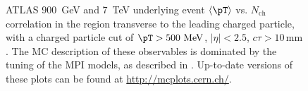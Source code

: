 \begin{figure}[tp]
  \centering
  \caption{ATLAS 900~GeV and 7~TeV underlying event $\langle \pT \rangle$
    vs. $N_\text{ch}$ correlation in the region transverse to the
    leading charged particle, with a charged particle \pT cut of
    $\pT > 500~\text{MeV}$, $|\eta| < 2.5$, $c\tau > 10\,\text{mm}$
    \cite{Aad:2010fh}. The MC description of
    these observables is dominated by the tuning of the MPI models, as
    described in . Up-to-date versions of
    these plots can be found at \url{http://mcplots.cern.ch/}.}
  \label{fig:cmp:mpi-ue-atlas-3}
\end{figure}

